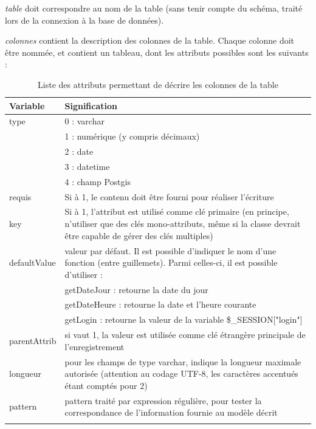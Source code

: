 \textit{table} doit correspondre au nom de la table (sans tenir compte du schéma, traité lors de la connexion à la base de données).

\textit{colonnes} contient la description des colonnes de la table. Chaque colonne doit être nommée, et contient un tableau, dont les  attributs possibles sont les suivants :

\begin{longtable}{|p{3cm}|p{10cm}|}
\hline
\textbf{Variable} & \textbf{Signification} \\
\hline
\endhead
type & 0 : varchar \\
& 1 : numérique (y compris décimaux) \\
& 2 : date \\
& 3 : datetime \\
& 4 : champ Postgis \\

requis & Si à 1, le contenu doit être fourni pour réaliser l'écriture \\

key & Si à 1, l'attribut est utilisé comme clé primaire (en principe, n'utiliser que des clés mono-attributs, même si la classe devrait être capable de gérer des clés multiples) \\

defaultValue & valeur par défaut. Il est possible d'indiquer le nom d'une fonction (entre guillemets). Parmi celles-ci, il est possible d'utiliser :\\
& getDateJour : retourne la date du jour \\
& getDateHeure : retourne la date et l'heure courante \\
& getLogin : retourne la valeur de la variable \$\_SESSION["login"]\\

parentAttrib & si vaut 1, la valeur est utilisée comme clé étrangère principale de l'enregistrement \\

longueur & pour les champs de type varchar, indique la longueur maximale autorisée (attention au codage UTF-8, les caractères accentués étant comptés pour 2) \\

pattern & pattern traité par expression régulière, pour tester la correspondance de l'information fournie au modèle décrit \\
\hline

\caption{Liste des attributs permettant de décrire les colonnes de la table\label{objetbdd-attr}}

\end{longtable}

